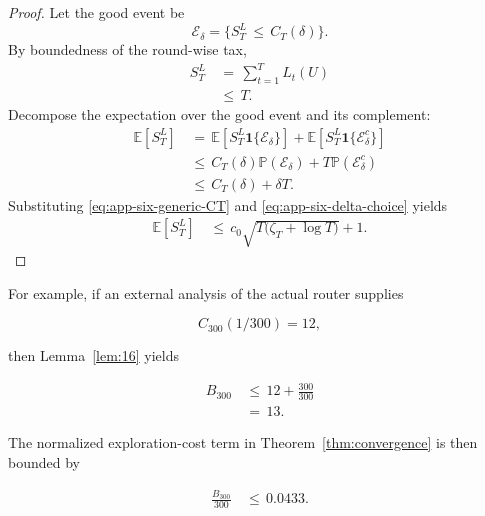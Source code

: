 \documentclass{article} %
\begin{document}
\begin{proof}
Let the good event be
\begin{equation}
\label{eq:app-six-good-event}
\mathcal{E}_\delta
=
\{S_T^L\,\le\, C_T(\delta)\}.
\end{equation}
By boundedness of the round-wise tax,
\begin{align}
\label{eq:app-six-ST-trivial-bound}
S_T^L
&\,=\,
\sum_{t=1}^{T}L_t(U)
\\
&\,\le\,
T.
\end{align}
Decompose the expectation over the good event and its complement:
\begin{align}
\label{eq:app-six-proof-expectation-split}
\mathbb{E}[S_T^L]
&\,=\,
\mathbb{E}[S_T^L\mathbf{1}\{\mathcal{E}_\delta\}]
+
\mathbb{E}[S_T^L\mathbf{1}\{\mathcal{E}_\delta^c\}]
\\
&\,\le\,
C_T(\delta)\mathbb{P}(\mathcal{E}_\delta)
+
T\mathbb{P}(\mathcal{E}_\delta^c)
\\
&\,\le\,
C_T(\delta)+\delta T.
\end{align}
Substituting \eqref{eq:app-six-generic-CT} and \eqref{eq:app-six-delta-choice} yields
\begin{align}
\label{eq:app-six-proof-generic-BT}
\mathbb{E}[S_T^L]
&\,\le\,
c_0\sqrt{T\bigl(\zeta_T+\log T\bigr)}
+
1.
\end{align}
\end{proof}

For example, if an external analysis of the actual router supplies

\begin{equation}
\label{eq:app-six-bridge-example-CT}
C_{300}(1/300)=12,
\end{equation}

then Lemma~\ref{lem:16} yields

\begin{align}
\label{eq:app-six-bridge-example-BT}
B_{300}
&\,\le\,
12+\frac{300}{300}
\\
&\,=\,
13.
\end{align}

The normalized exploration-cost term in Theorem~\ref{thm:convergence} is then bounded by

\begin{align}
\label{eq:app-six-bridge-example-normalized}
\frac{B_{300}}{300}
&\,\le\,
0.0433.
\end{align}
\end{document}
